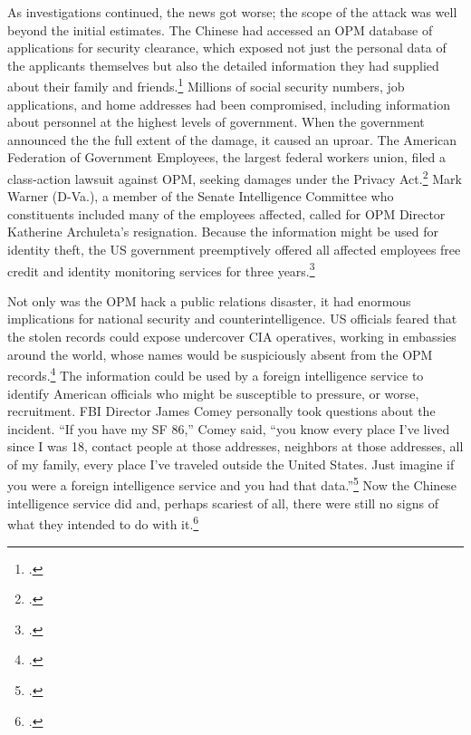 \documentclass{memoir}
\begin{document}
\begin{refsegment}
As investigations continued, the news got worse; the scope of the attack was well beyond the initial estimates. The Chinese had accessed an OPM database of applications for security clearance, which exposed not just the personal data of the applicants themselves but also the detailed information they had supplied about their family and friends.\footcite{nakashima_hacks_2015} Millions of social security numbers, job applications, and home addresses had been compromised, including information about personnel at the highest levels of government. When the government announced the the full extent of the damage, it caused an uproar. The American Federation of Government Employees, the largest federal workers union, filed a class-action lawsuit against OPM, seeking damages under the Privacy Act.\footcite[The lawsuits were later dismissed.]{chalfant_court_2017} Mark Warner (D-Va.), a member of the Senate Intelligence Committee who constituents included many of the employees affected, called for OPM Director Katherine Archuleta's resignation. Because the information might be used for identity theft, the US government preemptively offered all affected employees free credit and identity monitoring services for three years.\footcite{nakashima_hacks_2015}

Not only was the OPM hack a public relations disaster, it had enormous implications for national security and counterintelligence. US officials feared that the stolen records could expose undercover CIA operatives, working in embassies around the world, whose names would be suspiciously absent from the OPM records.\footcite{nakashima_hacks_2015} The information could be used by a foreign intelligence service to identify American officials who might be susceptible to pressure, or worse, recruitment. FBI Director James Comey personally took questions about the incident. ``If you have my SF 86,'' Comey said, ``you know every place I've lived since I was 18, contact people at those addresses, neighbors at those addresses, all of my family, every place I've traveled outside the United States. Just imagine if you were a foreign intelligence service and you had that data.''\footcite{nakashima_hacks_2015} Now the Chinese intelligence service did and, perhaps scariest of all, there were still no signs of what they intended to do with it.\footcite{koerner_inside_2016}


\end{refsegment}
\end{document}

